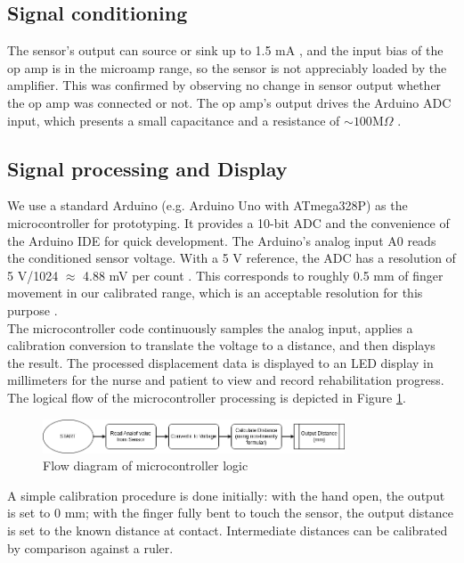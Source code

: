 \documentclass[a4paper,12pt]{article}
\begin{document}
\subsection{Signal conditioning}
The sensor’s output can source or sink up to 1.5 mA  \cite{ti_datasheet}, and the input bias of the op amp is in the microamp range, so the sensor is not appreciably loaded by the amplifier. This was confirmed by observing no change in sensor output whether the op amp was connected or not. The op amp’s output drives the Arduino ADC input, which presents a small capacitance and a resistance of $\sim 100 \text{M} \Omega$ \cite{arduino}.

\subsection{Signal processing and Display}
We use a standard Arduino (e.g. Arduino Uno with ATmega328P) as the microcontroller for prototyping. It provides a 10-bit ADC and the convenience of the Arduino IDE for quick development. The Arduino’s analog input A0 reads the conditioned sensor voltage. With a 5 V reference, the ADC has a resolution of 5 V/1024 $\approx$ 4.88 mV per count \cite{hu2025adc}. This corresponds to roughly 0.5 mm of finger movement in our calibrated range, which is an acceptable resolution for this purpose \cite{kortier2014assessment}.\\ 
The microcontroller code continuously samples the analog input, applies a calibration conversion to translate the voltage to a distance, and then displays the result. The processed displacement data is displayed to an LED display in millimeters for the nurse and patient to view and record rehabilitation progress. The logical flow of the microcontroller processing is depicted in Figure \ref{fig:flow}.
\begin{figure}[ht]
    \centering
    \includegraphics[width=0.8\textwidth]{LabMCUFlow.png}
    \caption{Flow diagram of microcontroller logic}
    \label{fig:flow}
\end{figure}
A simple calibration procedure is done initially: with the hand open, the output is set to 0 mm; with the finger fully bent to touch the sensor, the output distance is set to the known distance at contact. Intermediate distances can be calibrated by comparison against a ruler. 
\end{document}
